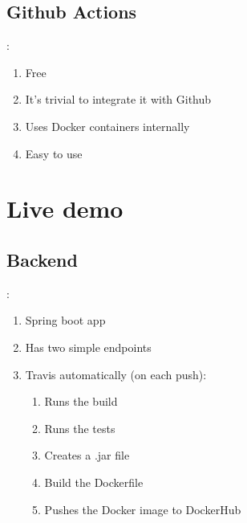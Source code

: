 \documentclass{beamer}
\begin{document}
\subsection{Github Actions}
\begin{frame}{\secname : \subsecname}


\begin{enumerate}
    \item Free
    \item It's trivial to integrate it with Github
    \item Uses Docker containers internally
    \item Easy to use
\end{enumerate}

\end{frame}


\section{Live demo}

\subsection{Backend}
\begin{frame}{\secname : \subsecname}

\begin{enumerate}
    \item Spring boot app
    \item Has two simple endpoints
    \item Travis automatically (on each push):
    \begin{enumerate}
        \item Runs the build
        \item Runs the tests
        \item Creates a .jar file
        \item Build the Dockerfile
        \item Pushes the Docker image to DockerHub
    \end{enumerate}
\end{enumerate}

\end{frame}
\end{document}

